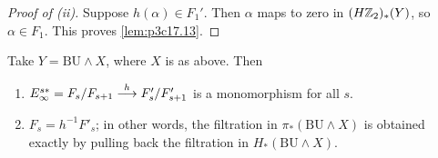 \documentclass[../main]{subfiles}
\begin{document}
\begin{proof}[Proof of (ii)]
Suppose $h(\alpha) \in F_1'$. Then $\alpha$ maps to zero in $(H\mathbb{Z}_2)_\ast(Y)$, so $\alpha \in F_1$. This proves \ref{lem:p3c17.13}. 
\end{proof}

\begin{lemma}
\label{lem:p3c17.14}
Take $Y = \mathrm{BU} \wedge X$, where $X$ is as above. Then 

\begin{enumerate}
    \item[(i)] $E_\infty^{s\ast} = F_s/F_{s + 1} \overset{h}{\longrightarrow} F_s'/F'_{s + 1}$ is a monomorphism for all $s$.
    \item[(ii)] $F_s = h^{-1} F'_s$; in other words, the filtration in $\pi_\ast(\mathrm{BU} \wedge X)$ is obtained exactly by pulling back the filtration in $H_\ast(\mathrm{BU} \wedge X)$.
\end{enumerate}
\end{lemma}
\end{document}
